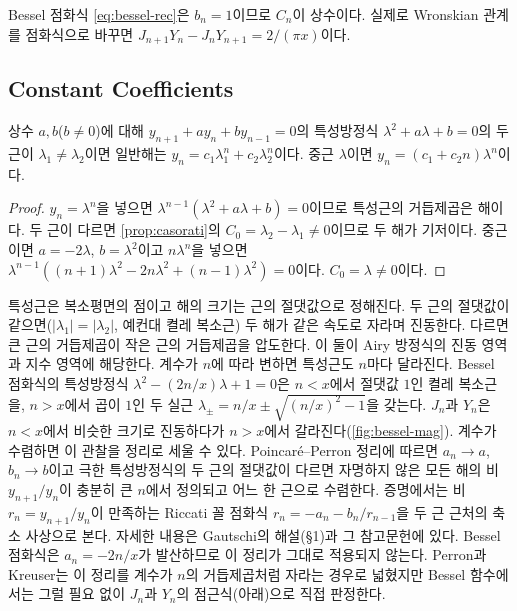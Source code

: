 Bessel 점화식 \cref{eq:bessel-rec}은 $b_n=1$이므로 $C_n$이 상수이다. 실제로 Wronskian 관계를 점화식으로 바꾸면 $J_{n+1}Y_n-J_nY_{n+1}=2/(\pi x)$이다.

\subsection{Constant Coefficients}

\begin{proposition}
\label{prop:const-coeff}
상수 $a,b$($b\ne0$)에 대해 $y_{n+1}+ay_n+by_{n-1}=0$의 특성방정식 $\lambda^2+a\lambda+b=0$의 두 근이 $\lambda_1\ne\lambda_2$이면 일반해는 $y_n=c_1\lambda_1^n+c_2\lambda_2^n$이다. 중근 $\lambda$이면 $y_n=(c_1+c_2n)\lambda^n$이다.
\end{proposition}

\begin{proof}
$y_n=\lambda^n$을 넣으면 $\lambda^{n-1}(\lambda^2+a\lambda+b)=0$이므로 특성근의 거듭제곱은 해이다. 두 근이 다르면 \cref{prop:casorati}의 $C_0=\lambda_2-\lambda_1\ne0$이므로 두 해가 기저이다. 중근이면 $a=-2\lambda$, $b=\lambda^2$이고 $n\lambda^n$을 넣으면 $\lambda^{n-1}((n+1)\lambda^2-2n\lambda^2+(n-1)\lambda^2)=0$이다. $C_0=\lambda\ne0$이다.
\end{proof}

특성근은 복소평면의 점이고 해의 크기는 근의 절댓값으로 정해진다. 두 근의 절댓값이 같으면($|\lambda_1|=|\lambda_2|$, 예컨대 켤레 복소근) 두 해가 같은 속도로 자라며 진동한다. 다르면 큰 근의 거듭제곱이 작은 근의 거듭제곱을 압도한다. 이 둘이 Airy 방정식의 진동 영역과 지수 영역에 해당한다. 계수가 $n$에 따라 변하면 특성근도 $n$마다 달라진다. Bessel 점화식의 특성방정식 $\lambda^2-(2n/x)\lambda+1=0$은 $n<x$에서 절댓값 $1$인 켤레 복소근을, $n>x$에서 곱이 $1$인 두 실근 $\lambda_\pm=n/x\pm\sqrt{(n/x)^2-1}$을 갖는다. $J_n$과 $Y_n$은 $n<x$에서 비슷한 크기로 진동하다가 $n>x$에서 갈라진다(\cref{fig:bessel-mag}). 계수가 수렴하면 이 관찰을 정리로 세울 수 있다. Poincaré--Perron 정리에 따르면 $a_n\to a$, $b_n\to b$이고 극한 특성방정식의 두 근의 절댓값이 다르면 자명하지 않은 모든 해의 비 $y_{n+1}/y_n$이 충분히 큰 $n$에서 정의되고 어느 한 근으로 수렴한다. 증명에서는 비 $r_n=y_{n+1}/y_n$이 만족하는 Riccati 꼴 점화식 $r_n=-a_n-b_n/r_{n-1}$을 두 근 근처의 축소 사상으로 본다. 자세한 내용은 Gautschi의 해설\cite{gautschi1967recurrence}(§1)과 그 참고문헌에 있다. Bessel 점화식은 $a_n=-2n/x$가 발산하므로 이 정리가 그대로 적용되지 않는다. Perron과 Kreuser는 이 정리를 계수가 $n$의 거듭제곱처럼 자라는 경우로 넓혔지만 Bessel 함수에서는 그럴 필요 없이 $J_n$과 $Y_n$의 점근식(아래)으로 직접 판정한다.

